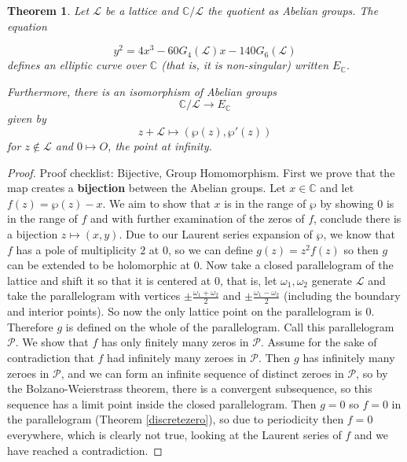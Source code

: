 \documentclass{article}
\newtheorem{thm}{Theorem}[section]
\theoremstyle{definition}
\theoremstyle{definition}
\theoremstyle{definition}
\newcommand{\C}{\mathbb{C}}
\begin{document}
\begin{thm} Let $\mathcal{L}$ be a lattice and $\C/\mathcal{L}$ the quotient as Abelian groups.
The equation

$$y^2=4x^3-60G_4(\mathcal{L})x-140G_6(\mathcal{L})$$
defines an elliptic curve over $\C$ (that is, it is non-singular) written $E_\C$.

Furthermore, there is an isomorphism of Abelian groups
$$\C/\mathcal{L}\to E_{\C}$$
given by
$$z+\mathcal{L}\mapsto (\wp(z),\wp'(z))$$
for $z\notin \mathcal{L}$ and $0\mapsto O$, the point at infinity.
\end{thm}

\begin{proof} Proof checklist: Bijective, Group Homomorphism.
\newline\newline
First we prove that the map creates a \textbf{bijection} between the Abelian groups. 
\newline\newline
Let $x\in\C$ and let $f(z)=\wp(z)-x$. We aim to show that $x$ is in the range of $\wp$ by showing $0$ is in the range of $f$ and with further examination of the zeros of $f$, conclude there is a bijection $z\mapsto (x,y)$.
\newline\newline
Due to our Laurent series expansion of $\wp$, we know that $f$ has a pole of multiplicity $2$ at $0$, so we can define $g(z)=z^2f(z)$ so then $g$ can be extended to be holomorphic at $0$. Now take a closed parallelogram of the lattice and shift it so that it is centered at $0$, that is,  let $\omega_1,\omega_2$ generate $\mathcal{L}$ and take the parallelogram with vertices $\pm\frac{\omega_1+\omega_2}{2}$ and $\pm\frac{\omega_1-\omega_2}{2}$ (including the boundary and interior points). So now the only lattice point on the parallelogram is $0$. Therefore $g$ is defined on the whole of the parallelogram. Call this parallelogram $\mathcal{P}$.
\newline\newline
We show that $f$ has only finitely many zeros in $\mathcal{P}$.
Assume for the sake of contradiction that $f$ had infinitely many zeroes in $\mathcal{P}$. Then $g$ has infinitely many zeroes in $\mathcal{P}$, and we can form an infinite sequence of distinct zeroes in $\mathcal{P}$, so by the Bolzano-Weierstrass theorem, there is a convergent subsequence, so this sequence has a limit point inside the closed parallelogram. Then $g=0$ so $f=0$ in the parallelogram (Theorem \ref{discretezero}), so due to periodicity then $f=0$ everywhere, which is clearly not true, looking at the Laurent series of $f$ and we have reached a contradiction.

\end{proof}
\end{document}
